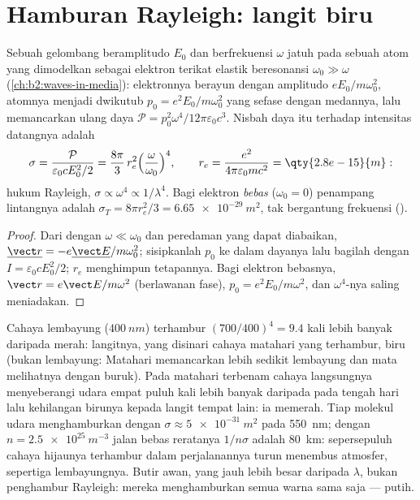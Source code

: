 \section{Hamburan Rayleigh: langit biru}

\begin{proposition}\label{prop:b2:dipole-radiation:rayleigh}
Sebuah gelombang beramplitudo $E_0$ dan berfrekuensi $\omega$ jatuh pada sebuah atom yang dimodelkan
sebagai elektron terikat elastik beresonansi $\omega_0 \gg \omega$
(\cref{ch:b2:waves-in-media}): elektronnya berayun dengan amplitudo
$eE_0/m\omega_0^2$, atomnya menjadi dwikutub $p_0 = e^2E_0/m\omega_0^2$ yang sefase
dengan medannya, lalu memancarkan ulang daya $\mathcal P = p_0^2\omega^4/12\pi
\varepsilon_0c^3$. Nisbah daya itu terhadap intensitas datangnya adalah
\emph{}
\[
\sigma = \frac{\mathcal P}{\varepsilon_0cE_0^2/2} = \frac{8\pi}3\,r_e^2\Bigl(\frac\omega{\omega_0}\Bigr)^4 ,
\qquad r_e = \frac{e^2}{4\pi\varepsilon_0mc^2} = \qty{2.8e-15}{m} :
\]
hukum Rayleigh, $\sigma \propto \omega^4 \propto 1/\lambda^4$. Bagi elektron \emph{bebas}
($\omega_0 = 0$) penampang lintangnya adalah $\sigma_T = 8\pi r_e^2/3 =
\qty{6.65e-29}{m^2}$, tak bergantung frekuensi ().
\end{proposition}

\begin{proof}
Dari  dengan $\omega \ll \omega_0$ dan peredaman yang dapat diabaikan,
$\underline{\vect r} = -e\underline{\vect E}/m\omega_0^2$; sisipkanlah $p_0$ ke dalam dayanya lalu
bagilah dengan $I = \varepsilon_0cE_0^2/2$; $r_e$ menghimpun tetapannya. Bagi elektron
bebasnya, $\vect r = e\vect E/m\omega^2$ (berlawanan fase), $p_0 = e^2E_0/m\omega^2$, dan
$\omega^4$-nya saling meniadakan.
\end{proof}

\begin{example}\label{ex:b2:dipole-radiation:sky}
Cahaya lembayung ($\qty{400}{nm}$) terhambur $(700/400)^4 = 9.4$ kali lebih banyak
daripada merah: langitnya, yang disinari cahaya matahari yang terhambur, biru (bukan lembayung:
Matahari memancarkan lebih sedikit lembayung dan mata melihatnya dengan buruk). Pada matahari terbenam cahaya
langsungnya menyeberangi udara empat puluh kali lebih banyak daripada pada tengah hari lalu kehilangan birunya kepada
langit tempat lain: ia memerah. Tiap molekul udara menghamburkan dengan
$\sigma \approx \qty{5e-31}{m^2}$ pada \qty{550}{nm}; dengan $n = \qty{2.5e25}{m^{-3}}$
jalan bebas reratanya $1/n\sigma$ adalah \qty{80}{km}: sepersepuluh cahaya hijaunya
terhambur dalam perjalanannya turun menembus atmosfer, sepertiga
lembayungnya. Butir awan, yang jauh lebih besar daripada $\lambda$, bukan penghambur
Rayleigh: mereka menghamburkan semua warna sama saja --- putih.
\end{example}


